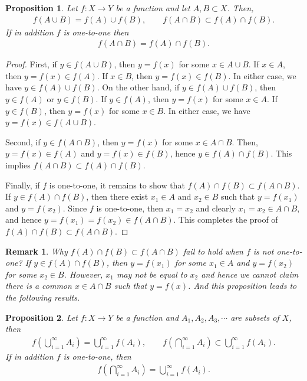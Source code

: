 \documentclass[10pt]{book}
\newtheorem{proposition}{Proposition}[chapter]
\newtheorem{remark}{Remark}[chapter]
\theoremstyle{definition}
\numberwithin{equation}{chapter}
\begin{document}
\medskip

\begin{proposition}
Let $f: X \to Y$ be a function and let $A, B \subset X$. Then,
\begin{align*}
    f(A \cup B) = f(A) \cup f(B), \qquad f(A \cap B) \subset f(A) \cap f(B).
\end{align*}
If in addition $f$ is one-to-one then
\begin{align*}
    f(A \cap B) = f(A) \cap f(B).
\end{align*}
\end{proposition}
\begin{proof}
First, if $y \in f(A \cup B)$, then $y = f(x)$ for some $x \in A \cup B$. If $x \in A$, then $y = f(x) \in f(A)$. If $x \in B$, then $y = f(x) \in f(B)$. In either case, we have $y \in f(A) \cup f(B)$. On the other hand, if $y \in f(A) \cup f(B)$, then $y \in f(A)$ or $y \in f(B)$. If $y \in f(A)$, then $y = f(x)$ for some $x \in A$. If $y \in f(B)$, then $y = f(x)$ for some $x \in B$. In either case, we have $y = f(x) \in f(A \cup B)$.

Second, if $y \in f(A \cap B)$, then $y = f(x)$ for some $x \in A \cap B$. Then, $y = f(x) \in f(A)$ and $y = f(x) \in f(B)$, hence $y \in f(A) \cap f(B)$. This implies $f(A \cap B) \subset f(A) \cap f(B)$.

Finally, if $f$ is one-to-one, it remains to show that $f(A) \cap f(B) \subset f(A \cap B)$. If $y \in f(A) \cap f(B)$, then there exist $x_1 \in A$ and $x_2 \in B$ such that $y = f(x_1)$ and $y = f(x_2)$. Since $f$ is one-to-one, then $x_1 = x_2$ and clearly $x_1 = x_2 \in A \cap B$, and hence $y = f(x_1) = f(x_2) \in f(A \cap B)$. This completes the proof of $f(A) \cap f(B) \subset f(A \cap B)$.
\end{proof}

\begin{remark}
Why $f(A) \cap f(B) \subset f(A \cap B)$ fail to hold when $f$ is not one-to-one? If $y \in f(A) \cap f(B)$, then $y = f(x_1)$ for some $x_1 \in A$ and $y = f(x_2)$ for some $x_2 \in B$. However, $x_1$ may not be equal to $x_2$ and hence we cannot claim there is a common $x \in A \cap B$ such that $y = f(x)$. And this proposition leads to the following results.
\end{remark}

\medskip

\begin{proposition}
Let $f: X \to Y$ be a function and $A_1, A_2, A_3, \cdots$ are subsets of $X$, then
\begin{align*}
    f \left(\bigcup^\infty_{i=1} A_i\right) = \bigcup^\infty_{i=1} f(A_i), \qquad f \left(\bigcap^\infty_{i=1} A_i\right) \subset \bigcup^\infty_{i=1} f(A_i).
\end{align*}
If in addition $f$ is one-to-one, then
\begin{align*}
    f \left(\bigcap^\infty_{i=1} A_i\right) = \bigcup^\infty_{i=1} f(A_i).
\end{align*}
\end{proposition}
\end{document}
